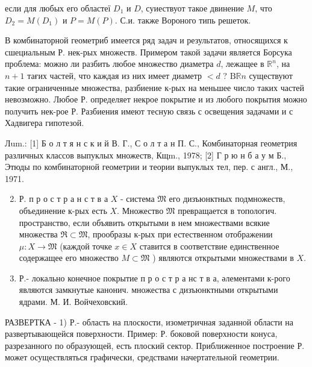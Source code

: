\documentclass[10pt]{article}
\begin{document}
если для любых его областеї $D_{1}$ и $D$, суиествуот такое двинение $M$, что $D_{2}=M\left(D_{1}\right)$ и $P=M(P)$. С.и. также Вороного типь решеток.



В комбинаторной геометриб имеется ряд задач и результатов, относящихся к сшециальным Р. нек-рых множеств. Примером такой задачи является Борсука проблема: можно ли разбить любое множество диаметра $d$, лежащее в $\mathbb{R}^{n}$, на $n+1$ тағих частей, что каждая из них имеет диаметр $<d$ ? $\mathrm{B} \mathbb{R} n$ существуют такие ограниченные множества, разбиение к-рых на меньшее число таких частей невозможно. Любое Р. определяет некрое покрытие и из любого покрытия можно получить нек-рое Р. Разбиения имеют тесную связь с освещения задачами и с Хадвигера гипотезой.



Лum.: [1] Б о л т я н с к и й В. Г., С о л т а н П. С., Комбинаторная геометрия различных классов выпуклых множеств, Кщm., 1978; [2] Г р ю н б а у м Б., Этюды по комбинаторной геометрии и теории выпуклых тел, пер. с англ., М., 1971.



\begin{enumerate}

  \setcounter{enumi}{1}

  \item Р. п р о с т р а н с т в а $X$ - система $\mathfrak{M}$ его дизъюнктных подмножеств, объединение к-рых есть $X$. Множество $\mathfrak{M}$ превращается в топологич. пространство, если объявить открытыми в нем множествами всякие множества $\mathfrak{\Re} \subset \mathfrak{M}$, прообразы к-рых при естественном отображении $\mu: X \rightarrow \mathfrak{M}$ (каждой точке $x \in X$ ставится в соответствие единственное содержащее его множество $M \subset \mathfrak{M}$ ) являются открытыми множествами в $X$.



  \item Р.- локально конечное покрытие п р о с т р а нс т в а, әлементами к-рого являются замкнутые канонич. множества с дизъюнктными открытыми ядрами. М. И. Войчеховский.



\end{enumerate}



РАЗВЕРТКА - 1) Р.- область на плоскости, изометричная заданной области на развертывающейся поверхности. Пример: Р. боковой поверхности конуса, разрезанного по образующей, есть плоский сектор. Приближенное построение Р. может осуществляться графически, средствами начертательной геометрии.
\end{document}
